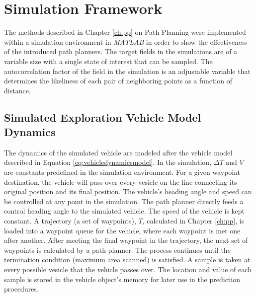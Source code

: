 \chapter{Simulation Framework}
The methods described in Chapter \ref{ch:pp} on Path Planning were implemented within a simulation environment in \textit{MATLAB} in order to show the effectiveness of the introduced path planners. The target fields in the simulations are of a variable size with a single state of interest that can be sampled. The autocorrelation factor of the field in the simulation is an adjustable variable that determines the likeliness of each pair of neighboring points as a function of distance. 

\section{Simulated Exploration Vehicle Model Dynamics}
The dynamics of the simulated vehicle are modeled after the vehicle model described in Equation \ref{eq:vehicledynamicsmodel}. In the simulation, $\Delta T$ and $V$ are constants predefined in the simulation environment. For a given waypoint destination, the vehicle will pass over every vesicle on the line connecting its original position and its final position. The vehicle's heading angle and speed can be controlled at any point in the simulation. The path planner directly feeds a control heading angle to the simulated vehicle. The speed of the vehicle is kept constant. A trajectory (a set of waypoints), $T$, calculated in Chapter \ref{ch:pp}, is loaded into a waypoint queue for the vehicle, where each waypoint is met one after another. After meeting the final waypoint in the trajectory, the next set of waypoints is calculated by a path planner. The process continues until the termination condition (maximum area scanned) is satisfied. A sample is taken at every possible vesicle that the vehicle passes over. The location and value of each sample is stored in the vehicle object's memory for later use in the prediction procedures.



